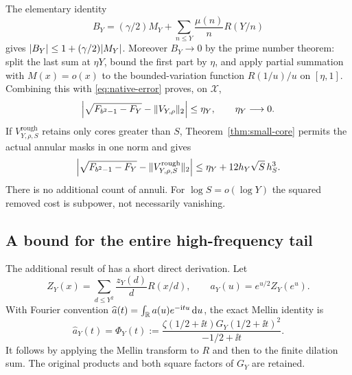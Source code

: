 The elementary identity
\[
 B_Y=(\gamma/2)M_Y+\sum_{n\le Y}\frac{\mu(n)}nR(Y/n)
\]
gives $\lvert B_Y\rvert\le1+(\gamma/2)\lvert M_Y\rvert$. Moreover $B_Y\to0$ by the prime number theorem: split the last sum at $\eta Y$, bound the first part by $\eta$, and apply partial summation with $M(x)=o(x)$ to the bounded-variation function $R(1/u)/u$ on $[\eta,1]$. Combining this with \eqref{eq:native-error} proves, on $\mathcal X$,
\begin{equation}\label{eq:crossing-comparison}
 \left|\sqrt{F_{b^2-1}-F_Y}-\lVert V_{Y,\rho}\rVert_2\right|
 \le\eta_Y,\qquad \eta_Y\longrightarrow0.
\end{equation}
If $V^{\mathrm{rough}}_{Y,\rho,S}$ retains only cores greater than $S$, Theorem~\ref{thm:small-core} permits the actual annular masks in one norm and gives
\begin{equation}\label{eq:rough-comparison}
 \left|\sqrt{F_{b^2-1}-F_Y}-\lVert V^{\mathrm{rough}}_{Y,\rho,S}\rVert_2\right|
 \le\eta_Y+12h_Y\sqrt S\,h_S^3.
\end{equation}
There is no additional count of annuli. For $\log S=o(\log Y)$ the squared removed cost is subpower, not necessarily vanishing.

\subsection{A bound for the entire high-frequency tail}
The additional result of \cite[arithmetic frequency-tail proof]{R1003} has a short direct derivation. Let
\[
 Z_Y(x)=\sum_{d\le Y^2}\frac{z_Y(d)}dR(x/d),\qquad
 a_Y(u)=e^{u/2}Z_Y(e^u).
\]
With Fourier convention $\widehat a(t)=\int_\mathbb R a(u)e^{-\mathrm i tu}\,\mathrm d u$, the exact Mellin identity is
\begin{equation}\label{eq:native-Fourier}
 \widehat a_Y(t)=\Phi_Y(t)
 :=\frac{\zeta(1/2+\ii t)G_Y(1/2+\ii t)^2}{-1/2+\ii t}.
\end{equation}
It follows by applying the Mellin transform to $R$ and then to the finite dilation sum. The original products and both square factors of $G_Y$ are retained.


